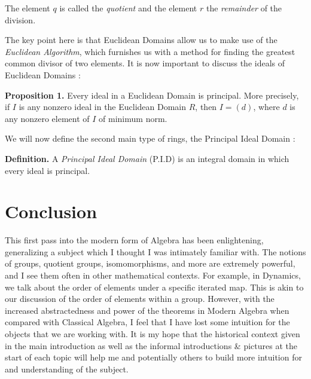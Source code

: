 \documentclass[11pt, reqno]{amsart}
\theoremstyle{plain}
\theoremstyle{definition}
\theoremstyle{example}
\begin{document}
The element $q$ is called the \textit{quotient} and the element $r$ the \textit{remainder} of the division.

\par
The key point here is that Euclidean Domains allow us to make use of the \textit{Euclidean Algorithm}, which furnishes us with a method for finding the greatest common divisor of two elements. It is now important to discuss the ideals of Euclidean Domains \cite[\S 8.1, p. 273]{dummit}:

\par
\textbf{Proposition 1.} Every ideal in a Euclidean Domain is principal. More precisely, if $I$ is any nonzero ideal in the Euclidean Domain $R$, then $I = (d)$, where $d$ is any nonzero element of $I$ of minimum norm.

\par
We will now define the second main type of rings, the Principal Ideal Domain \cite[\S 8.2, p. 279]{dummit}:

\textbf{Definition.} A \textit{Principal Ideal Domain} (P.I.D) is an integral domain in which every ideal is principal.

\section{Conclusion}

\par
This first pass into the modern form of Algebra has been enlightening, generalizing a subject which I thought I was intimately familiar with. The notions of groups, quotient groups, isomomorphisms, and more are extremely powerful, and I see them often in other mathematical contexts. For example, in Dynamics, we talk about the order of elements under a specific iterated map. This is akin to our discussion of the order of elements within a group. However, with the increased abstractedness and power of the theorems in Modern Algebra when compared with Classical Algebra, I feel that I have lost some intuition for the objects that we are working with. It is my hope that the historical context given in the main introduction as well as the informal introductions \& pictures at the start of each topic will help me and potentially others to build more intuition for and understanding of the subject.
\end{document}
